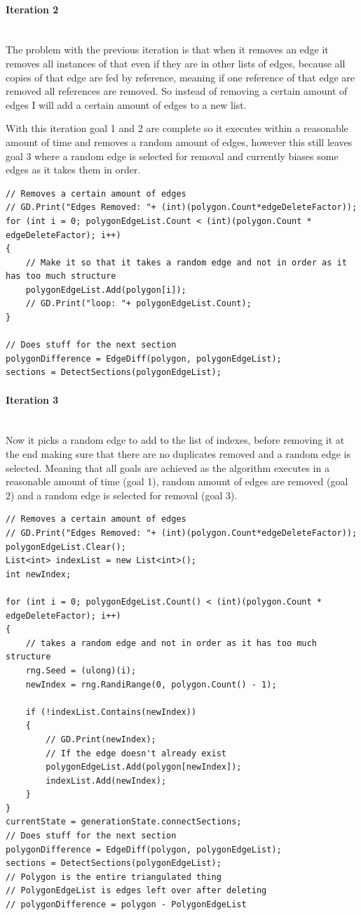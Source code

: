 \documentclass{article}
\newcommand{\parBr}{\vspace{5mm}}%
\newcommand{\myparagraph}[1]{\paragraph{#1}\mbox{}\\} %
\begin{document}
\myparagraph{Iteration 2}
The problem with the previous iteration is that when it removes an edge it removes all instances of that even if they are in other lists of edges, because all copies of that edge are fed by reference, meaning if one reference of that edge are removed all references are removed. So instead of removing a certain amount of edges I will add a certain amount of edges to a new list.

\parBr

With this iteration goal 1 and 2 are complete so it executes within a reasonable amount of time and removes a random amount of edges, however this still leaves goal 3 where a random edge is selected for removal and currently biases some edges as it takes them in order.
\begin{lstlisting}
// Removes a certain amount of edges
// GD.Print("Edges Removed: "+ (int)(polygon.Count*edgeDeleteFactor));
for (int i = 0; polygonEdgeList.Count < (int)(polygon.Count * edgeDeleteFactor); i++)
{
    // Make it so that it takes a random edge and not in order as it has too much structure
    polygonEdgeList.Add(polygon[i]);
    // GD.Print("loop: "+ polygonEdgeList.Count);
}

// Does stuff for the next section
polygonDifference = EdgeDiff(polygon, polygonEdgeList);
sections = DetectSections(polygonEdgeList);
\end{lstlisting}

\myparagraph{Iteration 3}
Now it picks a random edge to add to the list of indexes, before removing it at the end making sure that there are no duplicates removed and a random edge is selected. Meaning that all goals are achieved as the algorithm executes in a reasonable amount of time (goal 1), random amount of edges are removed (goal 2) and a random edge is selected for removal (goal 3).
\begin{lstlisting}
// Removes a certain amount of edges
// GD.Print("Edges Removed: "+ (int)(polygon.Count*edgeDeleteFactor));
polygonEdgeList.Clear();
List<int> indexList = new List<int>();
int newIndex;

for (int i = 0; polygonEdgeList.Count() < (int)(polygon.Count * edgeDeleteFactor); i++)
{
    // takes a random edge and not in order as it has too much structure
    rng.Seed = (ulong)(i);
    newIndex = rng.RandiRange(0, polygon.Count() - 1);

    if (!indexList.Contains(newIndex))
    {
        // GD.Print(newIndex);
        // If the edge doesn't already exist
        polygonEdgeList.Add(polygon[newIndex]);
        indexList.Add(newIndex);
    }
}
currentState = generationState.connectSections;
// Does stuff for the next section
polygonDifference = EdgeDiff(polygon, polygonEdgeList);
sections = DetectSections(polygonEdgeList);
// Polygon is the entire triangulated thing
// PolygonEdgeList is edges left over after deleting
// polygonDifference = polygon - PolygonEdgeList
\end{lstlisting}
\end{document}
